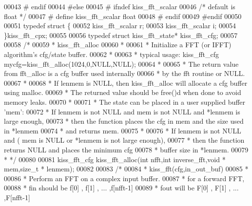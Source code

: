 \begin{DoxyCode}
00043 \textcolor{preprocessor}{# endif}
00044 \textcolor{preprocessor}{#else}
00045 \textcolor{preprocessor}{# ifndef kiss\_fft\_scalar}
00046 \textcolor{comment}{/*  default is float */}
00047 \textcolor{preprocessor}{#   define kiss\_fft\_scalar float}
00048 \textcolor{preprocessor}{# endif}
00049 \textcolor{preprocessor}{#endif}
00050 
00051 \textcolor{keyword}{typedef} \textcolor{keyword}{struct }\{
00052     kiss_fft_scalar r;
00053     kiss_fft_scalar i;
00054 \}kiss_fft_cpx;
00055 
00056 \textcolor{keyword}{typedef} \textcolor{keyword}{struct }kiss_fft_state* kiss_fft_cfg;
00057 
00058 \textcolor{comment}{/* }
00059 \textcolor{comment}{ *  kiss\_fft\_alloc}
00060 \textcolor{comment}{ *  }
00061 \textcolor{comment}{ *  Initialize a FFT (or IFFT) algorithm's cfg/state buffer.}
00062 \textcolor{comment}{ *}
00063 \textcolor{comment}{ *  typical usage:      kiss\_fft\_cfg mycfg=kiss\_fft\_alloc(1024,0,NULL,NULL);}
00064 \textcolor{comment}{ *}
00065 \textcolor{comment}{ *  The return value from fft\_alloc is a cfg buffer used internally}
00066 \textcolor{comment}{ *  by the fft routine or NULL.}
00067 \textcolor{comment}{ *}
00068 \textcolor{comment}{ *  If lenmem is NULL, then kiss\_fft\_alloc will allocate a cfg buffer using malloc.}
00069 \textcolor{comment}{ *  The returned value should be free()d when done to avoid memory leaks.}
00070 \textcolor{comment}{ *  }
00071 \textcolor{comment}{ *  The state can be placed in a user supplied buffer 'mem':}
00072 \textcolor{comment}{ *  If lenmem is not NULL and mem is not NULL and *lenmem is large enough,}
00073 \textcolor{comment}{ *      then the function places the cfg in mem and the size used in *lenmem}
00074 \textcolor{comment}{ *      and returns mem.}
00075 \textcolor{comment}{ *  }
00076 \textcolor{comment}{ *  If lenmem is not NULL and ( mem is NULL or *lenmem is not large enough),}
00077 \textcolor{comment}{ *      then the function returns NULL and places the minimum cfg }
00078 \textcolor{comment}{ *      buffer size in *lenmem.}
00079 \textcolor{comment}{ * */}
00080 
00081 kiss\_fft\_cfg kiss_fft_alloc(\textcolor{keywordtype}{int} nfft,\textcolor{keywordtype}{int} inverse\_fft,\textcolor{keywordtype}{void} * mem,\textcolor{keywordtype}{size\_t} * lenmem); 
00082 
00083 \textcolor{comment}{/*}
00084 \textcolor{comment}{ * kiss\_fft(cfg,in\_out\_buf)}
00085 \textcolor{comment}{ *}
00086 \textcolor{comment}{ * Perform an FFT on a complex input buffer.}
00087 \textcolor{comment}{ * for a forward FFT,}
00088 \textcolor{comment}{ * fin should be  f[0] , f[1] , ... ,f[nfft-1]}
00089 \textcolor{comment}{ * fout will be   F[0] , F[1] , ... ,F[nfft-1]}

\end{DoxyCode}

